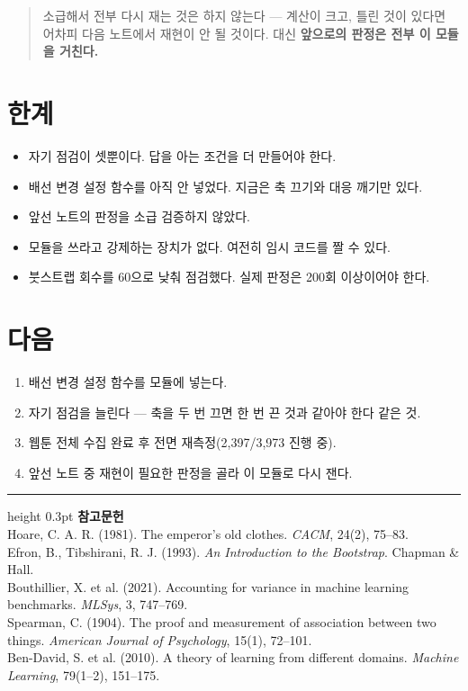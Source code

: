 \documentclass[10pt]{article}
\begin{document}
\begin{quote}\fontsize{9.5}{11.5}\selectfont
소급해서 전부 다시 재는 것은 하지 않는다 --- 계산이 크고, 틀린 것이 있다면
어차피 다음 노트에서 재현이 안 될 것이다. 대신 \textbf{앞으로의 판정은 전부
이 모듈을 거친다.}
\end{quote}

\section{한계}

\begin{itemize}[leftmargin=1.1em,itemsep=0.15em]
\item 자기 점검이 셋뿐이다. 답을 아는 조건을 더 만들어야 한다.
\item 배선 변경 설정 함수를 아직 안 넣었다. 지금은 축 끄기와 대응 깨기만 있다.
\item 앞선 노트의 판정을 소급 검증하지 않았다.
\item 모듈을 쓰라고 강제하는 장치가 없다. 여전히 임시 코드를 짤 수 있다.
\item 붓스트랩 회수를 60으로 낮춰 점검했다. 실제 판정은 200회 이상이어야 한다.
\end{itemize}

\section{다음}

\begin{enumerate}[leftmargin=1.3em,itemsep=0.15em]
\item 배선 변경 설정 함수를 모듈에 넣는다.
\item 자기 점검을 늘린다 --- 축을 두 번 끄면 한 번 끈 것과 같아야 한다 같은 것.
\item 웹툰 전체 수집 완료 후 전면 재측정(2,397/3,973 진행 중).
\item 앞선 노트 중 재현이 필요한 판정을 골라 이 모듈로 다시 잰다.
\end{enumerate}

\vspace{0.6em}
\hrule height 0.3pt
\vspace{0.5em}
{\footnotesize
\textbf{참고문헌}\\[0.3em]
Hoare, C. A. R. (1981). The emperor's old clothes. \emph{CACM}, 24(2), 75--83.\\[0.15em]
Efron, B., Tibshirani, R. J. (1993). \emph{An Introduction to the Bootstrap}.
Chapman \& Hall.\\[0.15em]
Bouthillier, X. et al. (2021). Accounting for variance in machine learning
benchmarks. \emph{MLSys}, 3, 747--769.\\[0.15em]
Spearman, C. (1904). The proof and measurement of association between two things.
\emph{American Journal of Psychology}, 15(1), 72--101.\\[0.15em]
Ben-David, S. et al. (2010). A theory of learning from different domains.
\emph{Machine Learning}, 79(1--2), 151--175.
}
\end{document}
